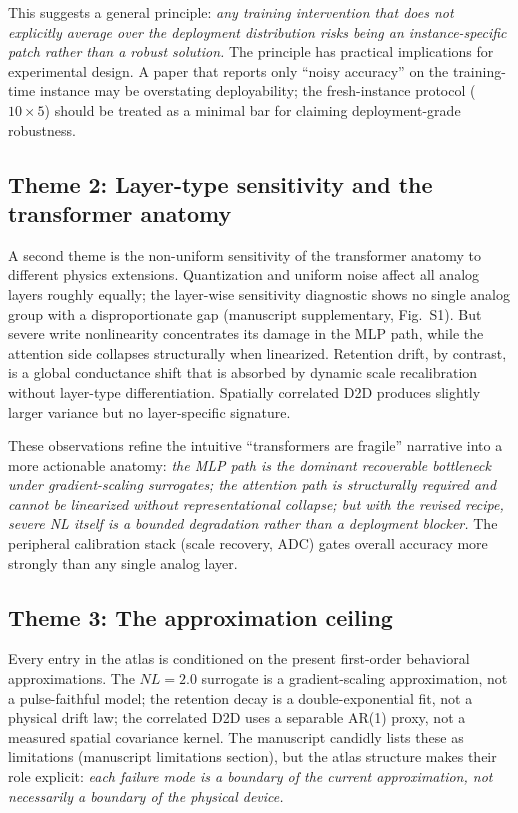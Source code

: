 This suggests a general principle: \emph{any training intervention that does not explicitly average over the deployment distribution risks being an instance-specific patch rather than a robust solution.}  The principle has practical implications for experimental design.  A paper that reports only ``noisy accuracy'' on the training-time instance may be overstating deployability; the fresh-instance protocol ($10 \times 5$) should be treated as a minimal bar for claiming deployment-grade robustness.

\subsection{Theme 2: Layer-type sensitivity and the transformer anatomy}

A second theme is the non-uniform sensitivity of the transformer anatomy to different physics extensions.  Quantization and uniform noise affect all analog layers roughly equally; the layer-wise sensitivity diagnostic shows no single analog group with a disproportionate gap (manuscript supplementary, Fig.~S1).  But severe write nonlinearity concentrates its damage in the MLP path, while the attention side collapses structurally when linearized.  Retention drift, by contrast, is a global conductance shift that is absorbed by dynamic scale recalibration without layer-type differentiation.  Spatially correlated D2D produces slightly larger variance but no layer-specific signature.

These observations refine the intuitive ``transformers are fragile'' narrative into a more actionable anatomy: \emph{the MLP path is the dominant recoverable bottleneck under gradient-scaling surrogates; the attention path is structurally required and cannot be linearized without representational collapse; but with the revised recipe, severe NL itself is a bounded degradation rather than a deployment blocker.}  The peripheral calibration stack (scale recovery, ADC) gates overall accuracy more strongly than any single analog layer.

\subsection{Theme 3: The approximation ceiling}

Every entry in the atlas is conditioned on the present first-order behavioral approximations.  The $NL=2.0$ surrogate is a gradient-scaling approximation, not a pulse-faithful model; the retention decay is a double-exponential fit, not a physical drift law; the correlated D2D uses a separable AR(1) proxy, not a measured spatial covariance kernel.  The manuscript candidly lists these as limitations (manuscript limitations section), but the atlas structure makes their role explicit: \emph{each failure mode is a boundary of the current approximation, not necessarily a boundary of the physical device.}

